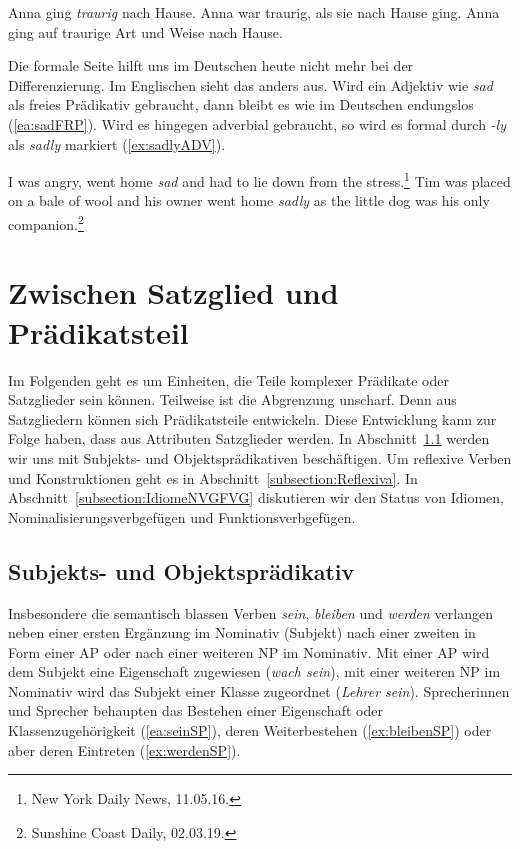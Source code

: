 \ea \label{ea:AdvUNDfrP}
\ea \label{ea:traurig_gehen} Anna ging \textit{traurig} nach Hause.
\ex \label{ex:traurig_frP} Anna war traurig, als sie nach Hause ging.
\ex \label{ex:traurig_Adv} Anna ging auf traurige Art und Weise nach Hause.
\z 
\z 

Die formale Seite hilft uns im Deutschen heute nicht mehr bei der Differenzierung. Im Englischen \zB sieht das anders aus. Wird ein Adjektiv wie \textit{sad} als freies Prädikativ gebraucht, dann bleibt es wie im Deutschen endungslos (\ref{ea:sadFRP}). Wird es hingegen adverbial gebraucht, so wird es formal durch \textit{-ly} als \textit{sadly} markiert (\ref{ex:sadlyADV}).

\ea \label{ea:AdvVSfrPenglisch}
\ea \label{ea:sadFRP} I was angry, went home \textit{sad} and had to lie down from the stress.\footnote{New York Daily News, 11.05.16.}
\ex \label{ex:sadlyADV} Tim was placed on a bale of wool and his owner went home \textit{sadly} as the little dog was his only companion.\footnote{Sunshine Coast Daily, 02.03.19.} 
\z 
\z 



\section{Zwischen Satzglied und Prädikatsteil}\label{subsection:Satzglied_Prädikat}

Im Folgenden geht es um Einheiten, die Teile komplexer Prädikate oder Satzglieder sein können. Teilweise ist die Abgrenzung unscharf. Denn aus Satzgliedern können sich Prädikatsteile entwickeln. Diese Entwicklung kann zur Folge haben, dass aus Attributen Satzglieder werden. In Abschnitt~\ref{subsection:SP und OP} werden wir uns mit Subjekts- und Objektsprädikativen beschäftigen. Um reflexive Verben und Konstruktionen geht es in Abschnitt~\ref{subsection:Reflexiva}. In Abschnitt~\ref{subsection:IdiomeNVGFVG} diskutieren wir den Status von Idiomen, Nominalisierungsverbgefügen und Funktionsverbgefügen.


\subsection{Subjekts- und Objektsprädikativ}\label{subsection:SP und OP}

Insbesondere die semantisch blassen Verben \textit{sein}, \textit{bleiben} und \textit{werden} verlangen neben einer ersten Ergänzung im Nominativ (Subjekt) nach einer zweiten in Form einer AP oder nach einer weiteren NP im Nominativ. Mit einer AP wird dem Subjekt eine Eigenschaft zugewiesen (\textit{wach sein}), mit einer weiteren NP im Nominativ wird das Subjekt einer Klasse zugeordnet (\textit{Lehrer sein}). Sprecherinnen und Sprecher behaupten das Bestehen einer Eigenschaft oder Klassenzugehörigkeit (\ref{ea:seinSP}), deren Weiterbestehen (\ref{ex:bleibenSP}) oder aber deren Eintreten (\ref{ex:werdenSP}).

